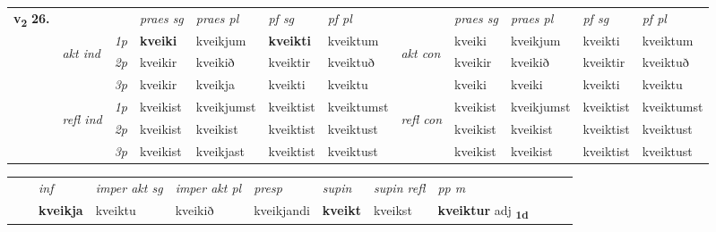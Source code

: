 \begin{tabular}{llllllllllll} \toprule
\multirow{4}{*}{{{\textbf{v{\textsubscript{2}}} \Large{\textbf{26.}}}}}  & &   &  \textit{praes sg}  & \textit{praes pl}  &\textit{ pf sg} & \textit{pf pl} &  &  \textit{praes sg}  & \textit{praes pl}  & \textit{pf sg} & \textit{pf pl } \\*
	\cmidrule{4-7} \cmidrule{9-12}
 & \multirow{3}{*}{\begin{turn}{90}\textit{akt ind}\end{turn}} & {\textit{1p}} & \textbf{kveiki} & kveikjum    & \textbf{kveikti} & kveiktum & \multirow{3}{*}{\begin{turn}{90}\textit{akt con}\end{turn}} &kveiki & kveikjum & kveikti & kveiktum\\*
& &  {\textit{2p}} &  kveikir  & kveikið   & kveiktir & kveiktuð & & kveikir & kveikið & kveiktir & kveiktuð \\*
& &  {\textit{3p}} & kveikir & kveikja   & kveikti & kveiktu & & kveiki & kveiki& kveikti & kveiktu  \\*
\cmidrule{4-7} \cmidrule{9-12}
 &\multirow{3}{*}{\begin{turn}{90}\textit{refl ind}\end{turn}} & {\textit{1p}} & kveikist & kveikjumst    & kveiktist & kveiktumst & \multirow{3}{*}{\begin{turn}{90}\textit{refl con}\end{turn}}  &kveikist & kveikjumst & kveiktist & kveiktumst\\*
 &&  {\textit{2p}} &  kveikist  & kveikist   & kveiktist & kveiktust & &kveikist & kveikist & kveiktist & kveiktust \\*
& &  {\textit{3p}} & kveikist & kveikjast   & kveiktist & kveiktust & & kveikist & kveikist& kveiktist & kveiktust  \\*
\cmidrule{4-7} \cmidrule{9-12}
\end{tabular}


\begin{tabular}{llllllllllll}
 & & \textit{inf} & \textit{imper akt sg} & \textit{imper akt pl}   & \textit{presp} & \textit{supin} & \textit{supin refl} & \textit{pp m}     \\*
  & & \textbf{kveikja} & kveiktu  & kveikið   & kveikjandi &  \textbf{kveikt} & kveikst & \textbf{kveiktur} adj \textbf{\textsubscript{1d}} \\*
\cmidrule{1-12}
\end{tabular}



